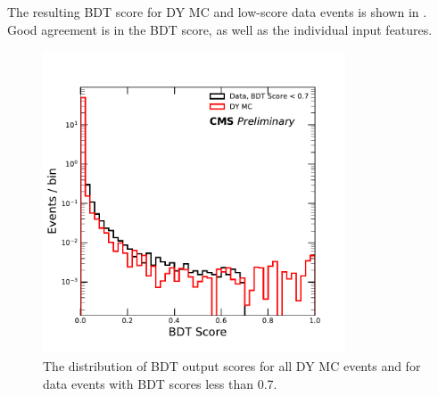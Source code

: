 The resulting BDT score for DY MC and low-score data events is shown in .
Good agreement is in the BDT score, as well as the individual input features.

\begin{figure}[htbp]
	\centering
	\includegraphics[width=0.8\textwidth]{figures/partialBDTScore.pdf}
        \caption[Low BDT Score Validation]{The distribution of BDT output scores for all DY MC events and for data events with BDT scores less than 0.7.}
	\label{fig:BDTlowvalid}
\end{figure}

